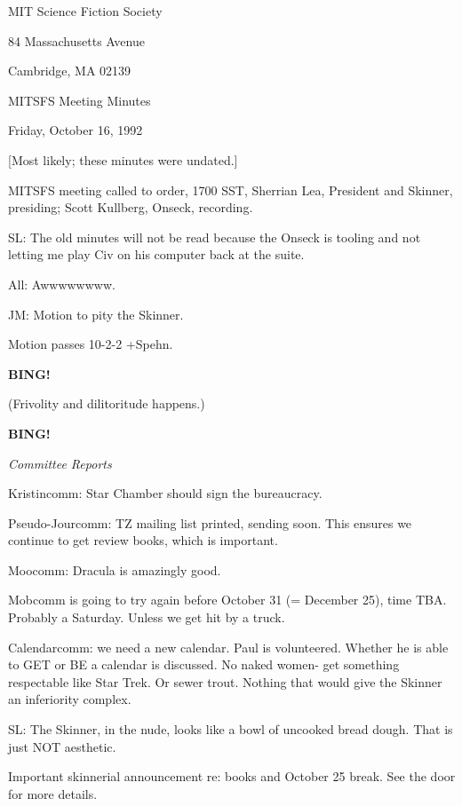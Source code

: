 \documentclass[12pt]{article}
\newcommand{\bing}{{\bf BING!} }
\newcommand{\goto}[1]{\bing \vskip 12pt \centerline{{\em{#1}}}}
\begin{document}
\begin{center}

MIT Science Fiction Society 

84 Massachusetts Avenue

Cambridge, MA 02139

\vspace{12pt}

MITSFS Meeting Minutes 

Friday, October 16, 1992

[Most likely; these minutes were undated.]

\end{center}
 
\vspace{18pt}

\setlength{\parskip}{6pt}

\noindent
MITSFS meeting called to order, 1700 SST,
Sherrian Lea, President and Skinner, presiding; Scott Kullberg, Onseck, recording.

SL: The old minutes will not be read because the Onseck is tooling and not letting me play Civ on his computer back at the suite.

All: Awwwwwwww.

JM: Motion to pity the Skinner.

Motion passes 10-2-2 +Spehn.

\bing

(Frivolity and dilitoritude happens.)

\goto{Committee Reports}

Kristincomm: Star Chamber should sign the bureaucracy.

Pseudo-Jourcomm: TZ mailing list printed, sending soon. This ensures we continue to get review books, which is important.

Moocomm: Dracula is amazingly good.

Mobcomm is going to try again before October 31 (= December 25), time TBA. Probably a Saturday. Unless we get hit by a truck.

Calendarcomm: we need a new calendar. Paul is volunteered. Whether he is able to GET or BE a calendar is discussed. No naked women- get something respectable like Star Trek. Or sewer trout. Nothing that would give the Skinner an inferiority complex.

SL: The Skinner, in the nude, looks like a bowl of uncooked bread dough. That is just NOT aesthetic.

Important skinnerial announcement re: books and October 25 break. See the door for more details.
\end{document}
